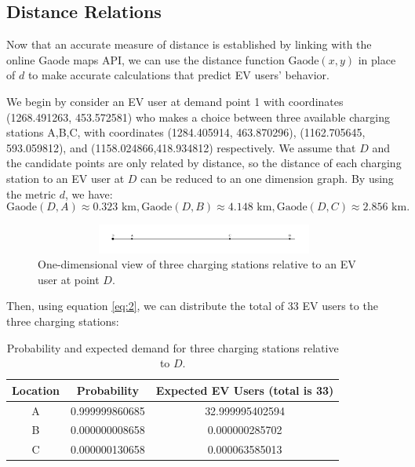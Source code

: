 \documentclass[10pt]{article}
\begin{document}
\subsection{Distance Relations}

Now that an accurate measure of distance is established by linking with the online Gaode maps API, we can use the distance function $\mathrm{Gaode} \left(x, y\right)$ in place of $d$ to make accurate calculations that predict EV users' behavior.

We begin by consider an EV user at demand point 1 with coordinates (1268.491263, 453.572581) who makes a choice between three available charging stations A,B,C, with coordinates (1284.405914, 463.870296), (1162.705645, 593.059812), and (1158.024866,418.934812) respectively. We assume that $D$ and the candidate points are only related by distance, so the distance of each charging station to an EV user at $D$ can be reduced to an one dimension graph. By using the metric $d$, we have: $$\mathrm{Gaode}\left(D, A\right) \approx 0.323 \text{ km}, \mathrm{Gaode}\left(D,B\right) \approx 4.148 \text{ km}, \mathrm{Gaode}\left(D, C\right) \approx 2.856 \text{ km}.$$

\begin{figure}[htbp]
    \centering
    \includegraphics[width=5.5in, height=0.38in, trim=10 35 10 35]{dots.pdf}
    \caption{One-dimensional view of three charging stations relative to an EV user at point $D$.}
    \label{fig:dots}
\end{figure}

Then, using equation \eqref{eq:2}, we can distribute the total of 33 EV users to the three charging stations:

{\renewcommand{\arraystretch}{1.9}%
\begin{table}[htbp]
    \centering
    \begin{tabular}{c|c|c}
        Location & Probability & Expected EV Users (total is 33) \\
        \hline
        A & 0.999999860685 & 32.999995402594 \\
        \hline
        B & 0.000000008658 & 0.000000285702 \\
        \hline
        C & 0.000000130658 & 0.000063585013\\
    \end{tabular}
    \caption{Probability and expected demand for three charging stations relative to $D$.}
    \label{tab:dist_prob}
\end{table}}
\end{document}
